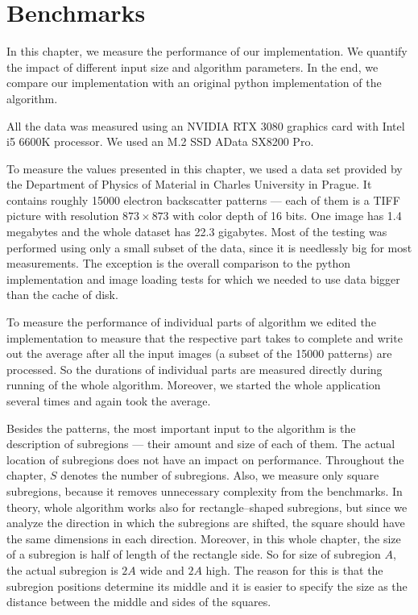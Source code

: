 \chapter{Benchmarks}
\label{chap3}

In this chapter, we measure the performance of our implementation. We quantify the impact of different input size and algorithm parameters. In the end, we compare our implementation with an original python implementation of the algorithm.

All the data was measured using an NVIDIA RTX 3080 graphics card with Intel i5 6600K processor. We used an M.2 SSD AData SX8200 Pro.

To measure the values presented in this chapter, we used a data set provided by the Department of Physics of Material in Charles University in Prague. It contains roughly 15000 electron backscatter patterns --- each of them is a TIFF picture with resolution $873 \times 873$ with color depth of 16 bits. One image has 1.4 megabytes and the whole dataset has 22.3 gigabytes. Most of the testing was performed using only a small subset of the data, since it is needlessly big for most measurements. The exception is the overall comparison to the python implementation and image loading tests for which we needed to use data bigger than the cache of disk.

To measure the performance of individual parts of algorithm we edited the implementation to measure that the respective part takes to complete and write out the average after all the input images (a subset of the 15000 patterns) are processed. So the durations of individual parts are measured directly during running of the whole algorithm. Moreover, we started the whole application several times and again took the average. 

Besides the patterns, the most important input to the algorithm is the description of subregions --- their amount and size of each of them. The actual location of subregions does not have an impact on performance. Throughout the chapter, $S$ denotes the number of subregions. Also, we measure only square subregions, because it removes unnecessary complexity from the benchmarks. In theory, whole algorithm works also for rectangle--shaped subregions, but since we analyze the direction in which the subregions are shifted, the square should have the same dimensions in each direction. Moreover, in this whole chapter, the size of a subregion is half of length of the rectangle side. So for size of subregion $A$, the actual subregion is $2A$ wide and $2A$ high. The reason for this is that the subregion positions determine its middle and it is easier to specify the size as the distance between the middle and sides of the squares.

